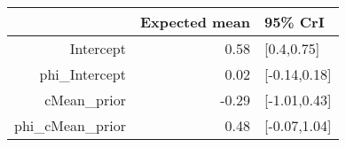 \begin{tabular}{rrl}
  \hline
 & Expected mean & 95\% CrI \\ 
  \hline
Intercept & 0.58 & [0.4,0.75] \\ 
  phi\_Intercept & 0.02 & [-0.14,0.18] \\ 
  cMean\_prior & -0.29 & [-1.01,0.43] \\ 
  phi\_cMean\_prior & 0.48 & [-0.07,1.04] \\ 
   \hline
\end{tabular}

